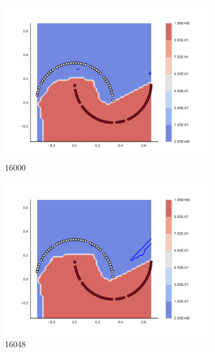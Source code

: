 \begin{figure}[h]
\begin{subfigure}[b]{0.09\textwidth}
    \includegraphics[clip, trim=2.35cm 1.75cm 4.5cm 0cm,width=\textwidth]{img/convergence/16000.pdf}
    \caption{16000}
    \label{fig:convergence_16000}
\end{subfigure}
%
\begin{subfigure}[b]{0.09\textwidth}
    \includegraphics[clip, trim=2.35cm 1.75cm 4.5cm 0cm,width=\textwidth]{img/convergence/16048.pdf}
    \caption{16048}
    \label{fig:convergence_16048}
\end{subfigure}
%
\begin{subfigure}[b]{0.09\textwidth}

\end{subfigure}
\end{figure}

